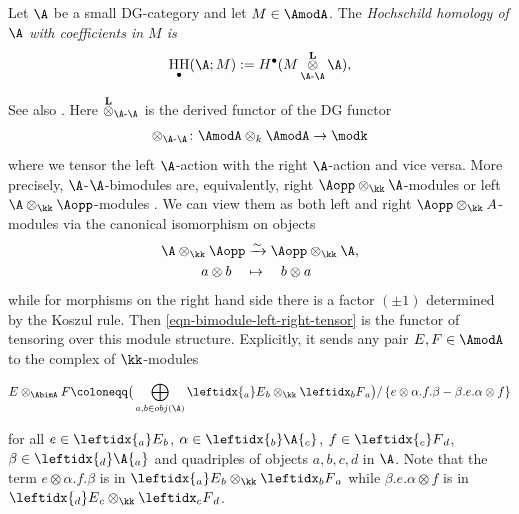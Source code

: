 \documentclass[12pt,a4paper,reqno]{amsart}
\DeclareMathOperator{\lder}{\bf L}
\DeclareMathOperator{\ldertimes}{\overset{\lder}{\otimes}}
\DeclareMathOperator{\hochhom}{{HH}}
\begin{document}
\begin{defn}
	Let $\A$ be a small DG-category and let $M \in \AmodA$. 
	The \em Hochschild homology of $\A$ with coefficients in $M$ \rm is 
	\begin{equation}
		\hochhom_\bullet(\A;M) := H^\bullet(M \ldertimes_{\A\text{-}\A} \A),
	\end{equation}
\end{defn}
See also \cite[\S1.1.3]{Loday-CyclicHomology}
\cite[\S3, Step
4]{Baranovsky-OrbifoldCohomologyAsPeriodicCyclicHomology}\cite[\S3.2]{Nordstrom-FiniteGroupActionsOnDGCategoriesAndHochschildHomology}. 
Here $\ldertimes_{\A\text{-}\A}$ is the derived functor of the DG functor
\begin{equation}
	\label{eqn-bimodule-left-right-tensor}
	\otimes_{\A\text{-}\A}\colon \AmodA \otimes_k \AmodA \rightarrow \modk 
\end{equation}
where we tensor the left $\A$-action with the right $\A$-action and vice
versa. More precisely, $\A$-$\A$-bimodules are, equivalently, right
$\Aopp \otimes_{\kk} \A$-modules or left $\A \otimes_\kk \Aopp$-modules . 
We can view them as both left and right $\Aopp \otimes_{\kk} A$-modules 
via the canonical isomorphism on objects
\begin{align*}
	\A \otimes_\kk \Aopp & \xrightarrow{\sim} \Aopp \otimes_\kk \A,
	\\
	a \otimes b \quad & \mapsto \quad b \otimes a
\end{align*}
while for morphisms on the right hand side there is a 
factor $(\pm 1)$ determined by the Koszul rule. Then
\eqref{eqn-bimodule-left-right-tensor} is the functor of tensoring 
over this module structure. Explicitly, it sends any pair $E, F \in
\AmodA$ to the complex of $\kk$-modules
\begin{small}
	\begin{equation}
		E \otimes_{\AbimA} F \coloneqq 
		\big(\bigoplus_{a, b \in obj(\A)} \leftidx{_a}E{_b} \otimes_\kk \leftidx_{b}F{_a}\big) /
		\left\{ e \otimes \alpha.f.\beta - \beta.e.\alpha \otimes f \right\}
	\end{equation}
\end{small}
for all $e \in \leftidx{_a} E {_b}$, $\alpha \in \leftidx{_b}\A{_c}$, 
$f \in \leftidx{_c}F{_d}$, $\beta \in \leftidx{_d}\A{_a}$ and quadriples
of objects $a, b, c, d$ in $\A$. Note that the term  
$e \otimes \alpha.f.\beta$ is in $\leftidx{_a}E{_b} \otimes_\kk \leftidx_{b}F{_a}$ while $\beta.e.\alpha \otimes f$ is 
in $\leftidx{_d}E{_c} \otimes_\kk \leftidx_{c}F{_d}$.
\end{document}
